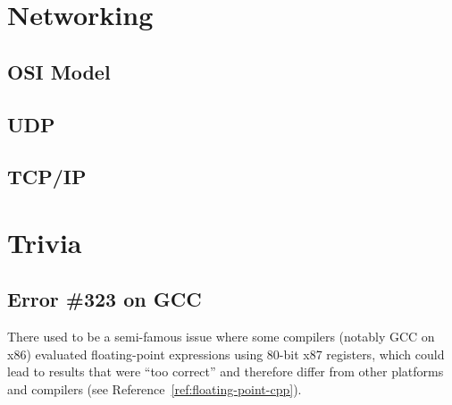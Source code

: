 \documentclass{article}
\begin{document}
\newpage
\section{Networking}
\subsection{OSI Model}
\subsection{UDP}
\subsection{TCP/IP}

\newpage
\section{Trivia}
\subsection{Error \#323 on GCC}
There used to be a semi-famous issue where some compilers (notably GCC on x86) evaluated
floating-point expressions using 80-bit x87 registers, which could lead to results that were
“too correct” and therefore differ from other platforms and compilers
(see Reference~\ref{ref:floating-point-cpp}).

\newpage
\end{document}
